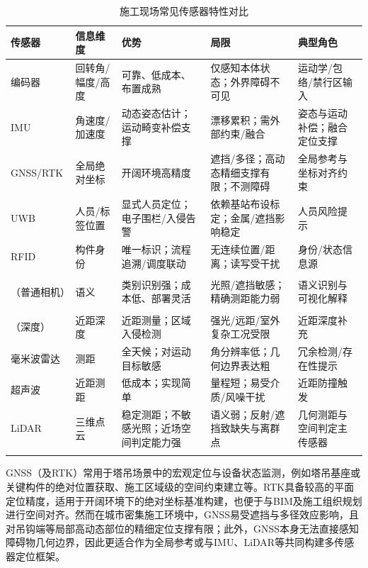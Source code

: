 \begin{table}[H]
  \centering
  \caption{施工现场常见传感器特性对比}
  \label{tab:sensor_summary}
  {\setlength{\tabcolsep}{3pt}
  \renewcommand{\arraystretch}{1.2}
  \renewcommand\tabularxcolumn[1]{m{#1}}
  \begin{tabularx}{\textwidth}{>{\centering\arraybackslash}m{2.0cm}>{\centering\arraybackslash}m{2.4cm}>{\centering\arraybackslash}X>{\centering\arraybackslash}X >{\centering\arraybackslash}m{2.8cm}}
    \Xhline{1pt}
    \textbf{传感器} & \textbf{信息维度} & \textbf{优势} & \textbf{局限} & \textbf{典型角色} \\
    \midrule
    编码器 & 回转角/幅度/高度 & 可靠、低成本、布置成熟 & 仅感知本体状态；外界障碍不可见 & 运动学/包络/禁行区输入 \\
    IMU & 角速度/加速度 & 动态姿态估计；运动畸变补偿支撑 & 漂移累积；需外部约束/融合 & 姿态与运动补偿；融合定位支撑 \\
    GNSS/RTK & 全局绝对坐标 & 开阔环境高精度 & 遮挡/多径；高动态精细支撑有限；不测障碍 & 全局参考与坐标对齐约束 \\
    UWB & 人员/标签位置 & 显式人员定位；电子围栏/入侵告警 & 依赖基站布设标定；金属/遮挡影响稳定 & 人员风险提示 \\
    RFID & 构件身份 & 唯一标识；流程追溯/调度联动 & 无连续位置/距离；读写受干扰 & 身份/状态信息源 \\
    \makecell{视觉\\（普通相机）} & 语义 & 类别识别强；成本低、部署灵活 & 光照/遮挡敏感；精确测距能力弱 & 语义识别与可视化解释 \\
    \makecell{视觉\\（深度）} & 近距深度 & 近距测量；区域入侵检测 & 强光/远距/室外复杂工况受限 & 近距深度补充 \\
    毫米波雷达 & 测距 & 全天候；对运动目标敏感 & 角分辨率低；几何边界表达粗 & 冗余检测/存在性提示 \\
    超声波 & 近距测距 & 低成本；实现简单 & 量程短；易受介质/风噪干扰 & 近距防撞触发 \\
    LiDAR & 三维点云 & 稳定测距；不敏感光照；近场空间判定能力强 & 语义弱；反射/遮挡致缺失与离群点 & 几何测距与空间判定主传感器 \\
    \Xhline{1pt}
  \end{tabularx}
  }
\end{table}


GNSS（及RTK）常用于塔吊场景中的宏观定位与设备状态监测，例如塔吊基座或关键构件的绝对位置获取、施工区域级的空间约束建立等。RTK具备较高的平面定位精度，适用于开阔环境下的绝对坐标基准构建，也便于与BIM及施工组织规划进行空间对齐。然而在城市密集施工环境中，GNSS易受遮挡与多径效应影响，且对吊钩端等局部高动态部位的精细定位支撑有限；此外，GNSS本身无法直接感知障碍物几何边界，因此更适合作为全局参考或与IMU、LiDAR等共同构建多传感器定位框架。

